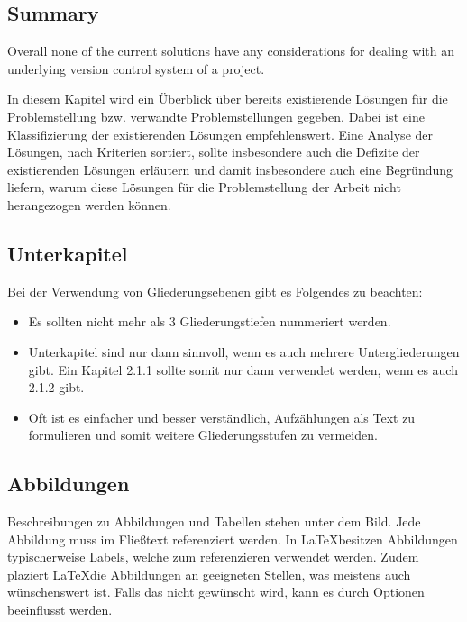 \begin{samepage}
	\subsection{Summary}
	Overall none of the current solutions have any considerations for dealing with an underlying version control system of a project.

In diesem Kapitel wird ein Überblick über bereits existierende Lösungen für die Problemstellung bzw. verwandte Problemstellungen gegeben. Dabei ist eine Klassifizierung der existierenden Lösungen empfehlenswert. Eine Analyse der Lösungen, nach Kriterien sortiert, sollte insbesondere auch die Defizite der existierenden Lösungen erläutern und damit insbesondere auch eine Begründung liefern, warum diese Lösungen für die Problemstellung der Arbeit nicht herangezogen werden können.

\subsection{Unterkapitel}

Bei der Verwendung von Gliederungsebenen gibt es Folgendes zu beachten:
\begin{itemize}
	\item Es sollten nicht mehr als 3 Gliederungstiefen nummeriert werden.
	\item Unterkapitel sind nur dann sinnvoll, wenn es auch mehrere Untergliederungen gibt. Ein Kapitel 2.1.1 sollte somit nur dann verwendet werden, wenn es auch 2.1.2 gibt.
	\item Oft ist es einfacher und besser verständlich, Aufzählungen als Text zu formulieren und somit weitere Gliederungsstufen zu vermeiden.
\end{itemize}

\subsection{Abbildungen}
\label{sec:abbildungen}

Beschreibungen zu Abbildungen und Tabellen stehen unter dem Bild. Jede Abbildung muss im Fließtext referenziert werden. In \LaTeX besitzen Abbildungen typischerweise Labels, welche zum referenzieren verwendet werden. Zudem plaziert \LaTeX die Abbildungen an geeigneten Stellen, was meistens auch wünschenswert ist. Falls das nicht gewünscht wird, kann es durch Optionen beeinflusst werden.


\end{samepage}
